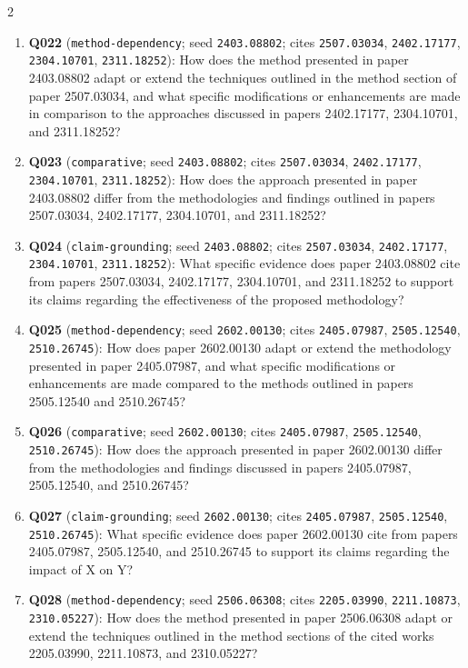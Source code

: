 \documentclass[10pt]{article}
\begin{document}
{\begin{multicols}{2}
\begin{enumerate}[leftmargin=1.0em,itemsep=0.05em,topsep=0pt,parsep=0pt]
  \item \textbf{Q022} (\texttt{method-dependency}; seed \texttt{2403.08802}; cites \texttt{2507.03034}, \texttt{2402.17177}, \texttt{2304.10701}, \texttt{2311.18252}): How does the method presented in paper 2403.08802 adapt or extend the techniques outlined in the method section of paper 2507.03034, and what specific modifications or enhancements are made in comparison to the approaches discussed in papers 2402.17177, 2304.10701, and 2311.18252?
  \item \textbf{Q023} (\texttt{comparative}; seed \texttt{2403.08802}; cites \texttt{2507.03034}, \texttt{2402.17177}, \texttt{2304.10701}, \texttt{2311.18252}): How does the approach presented in paper 2403.08802 differ from the methodologies and findings outlined in papers 2507.03034, 2402.17177, 2304.10701, and 2311.18252?
  \item \textbf{Q024} (\texttt{claim-grounding}; seed \texttt{2403.08802}; cites \texttt{2507.03034}, \texttt{2402.17177}, \texttt{2304.10701}, \texttt{2311.18252}): What specific evidence does paper 2403.08802 cite from papers 2507.03034, 2402.17177, 2304.10701, and 2311.18252 to support its claims regarding the effectiveness of the proposed methodology?
  \item \textbf{Q025} (\texttt{method-dependency}; seed \texttt{2602.00130}; cites \texttt{2405.07987}, \texttt{2505.12540}, \texttt{2510.26745}): How does paper 2602.00130 adapt or extend the methodology presented in paper 2405.07987, and what specific modifications or enhancements are made compared to the methods outlined in papers 2505.12540 and 2510.26745?
  \item \textbf{Q026} (\texttt{comparative}; seed \texttt{2602.00130}; cites \texttt{2405.07987}, \texttt{2505.12540}, \texttt{2510.26745}): How does the approach presented in paper 2602.00130 differ from the methodologies and findings discussed in papers 2405.07987, 2505.12540, and 2510.26745?
  \item \textbf{Q027} (\texttt{claim-grounding}; seed \texttt{2602.00130}; cites \texttt{2405.07987}, \texttt{2505.12540}, \texttt{2510.26745}): What specific evidence does paper 2602.00130 cite from papers 2405.07987, 2505.12540, and 2510.26745 to support its claims regarding the impact of X on Y?
  \item \textbf{Q028} (\texttt{method-dependency}; seed \texttt{2506.06308}; cites \texttt{2205.03990}, \texttt{2211.10873}, \texttt{2310.05227}): How does the method presented in paper 2506.06308 adapt or extend the techniques outlined in the method sections of the cited works 2205.03990, 2211.10873, and 2310.05227?

\end{enumerate}
\end{multicols}}
\end{document}
